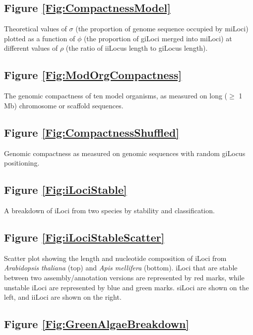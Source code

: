 \subsection*{Figure \ref{Fig:CompactnessModel}}

\noindent
Theoretical values of $\sigma$ (the proportion of genome sequence occupied by miLoci) plotted as a function of $\phi$ (the proportion of giLoci merged into miLoci) at different values of $\rho$ (the ratio of iiLocus length to giLocus length).

\subsection*{Figure \ref{Fig:ModOrgCompactness}}

\noindent
The genomic compactness of ten model organisms, as measured on long ($\geq$ 1 Mb) chromosome or scaffold sequences.

\subsection*{Figure \ref{Fig:CompactnessShuffled}}

\noindent
Genomic compactness as measured on genomic sequences with random giLocus positioning.

\subsection*{Figure \ref{Fig:iLociStable}}

\noindent
A breakdown of iLoci from two species by stability and classification.

\subsection*{Figure \ref{Fig:iLociStableScatter}}

\noindent
Scatter plot showing the length and nucleotide composition of iLoci from \textit{Arabidopsis thaliana} (top) and \textit{Apis mellifera} (bottom). iLoci that are stable between two assembly/annotation versions are represented by red marks, while unstable iLoci are represented by blue and green marks. siLoci are shown on the left, and iiLoci are shown on the right.

\subsection*{Figure \ref{Fig:GreenAlgaeBreakdown}}

